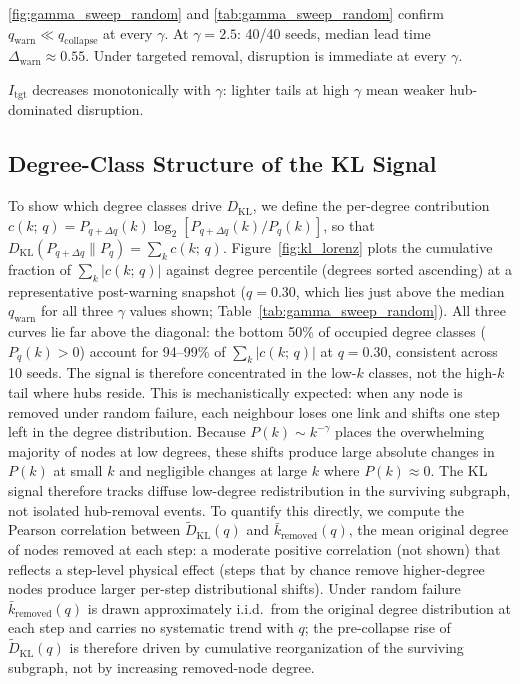\documentclass{nws}
\begin{document}
\autoref{fig:gamma_sweep_random} and \autoref{tab:gamma_sweep_random} confirm
$q_{\mathrm{warn}} \ll q_{\mathrm{collapse}}$ at every $\gamma$. At $\gamma=2.5$:
40/40 seeds, median lead time $\Delta_{\mathrm{warn}} \approx 0.55$. Under targeted
removal, disruption is immediate at every $\gamma$.

\FloatBarrier


$I_{\mathrm{tgt}}$ decreases monotonically with $\gamma$: lighter tails at high $\gamma$
mean weaker hub-dominated disruption.
\FloatBarrier

\subsection{Degree-Class Structure of the KL Signal}
\label{sec:kl_degree_structure}
To show which degree classes drive $D_{\mathrm{KL}}$, we define the per-degree contribution
$c(k;\,q) = P_{q+\Delta q}(k)\log_2[P_{q+\Delta q}(k)/P_q(k)]$,
so that $D_{\mathrm{KL}}(P_{q+\Delta q}\|P_q) = \sum_k c(k;\,q)$.
Figure~\ref{fig:kl_lorenz} plots the cumulative fraction of $\sum_k|c(k;\,q)|$ against
degree percentile (degrees sorted ascending) at a representative post-warning snapshot
($q=0.30$, which lies just above the median $q_{\mathrm{warn}}$ for all three $\gamma$ values shown;
Table~\ref{tab:gamma_sweep_random}).
All three curves lie far above the diagonal: the bottom 50\% of occupied degree classes
($P_q(k)>0$) account for 94--99\% of $\sum_k|c(k;\,q)|$ at $q=0.30$, consistent across 10 seeds.
The signal is therefore concentrated in the low-$k$ classes, not the high-$k$ tail where hubs reside.
This is mechanistically expected: when any node is removed under random failure, each neighbour loses one link and shifts one step left in the degree distribution.
Because $P(k)\sim k^{-\gamma}$ places the overwhelming majority of nodes at low degrees, these shifts produce large absolute changes in $P(k)$ at small $k$ and negligible changes at large $k$ where $P(k)\approx 0$.
The KL signal therefore tracks diffuse low-degree redistribution in the surviving subgraph, not isolated hub-removal events.
To quantify this directly, we compute the Pearson correlation between $\tilde{D}_{\mathrm{KL}}(q)$ and $\bar{k}_{\mathrm{removed}}(q)$, the mean original degree of nodes removed at each step: a moderate positive correlation (not shown) that reflects a step-level physical effect (steps that by chance remove higher-degree nodes produce larger per-step distributional shifts). Under random failure $\bar{k}_{\mathrm{removed}}(q)$ is drawn approximately i.i.d.\ from the original degree distribution at each step and carries no systematic trend with $q$; the pre-collapse rise of $\tilde{D}_{\mathrm{KL}}(q)$ is therefore driven by cumulative reorganization of the surviving subgraph, not by increasing removed-node degree.
\end{document}

